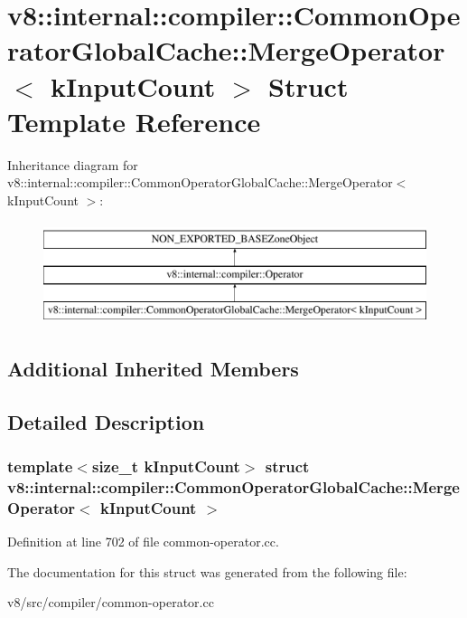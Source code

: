 \hypertarget{structv8_1_1internal_1_1compiler_1_1CommonOperatorGlobalCache_1_1MergeOperator}{}\section{v8\+:\+:internal\+:\+:compiler\+:\+:Common\+Operator\+Global\+Cache\+:\+:Merge\+Operator$<$ k\+Input\+Count $>$ Struct Template Reference}
\label{structv8_1_1internal_1_1compiler_1_1CommonOperatorGlobalCache_1_1MergeOperator}
Inheritance diagram for v8\+:\+:internal\+:\+:compiler\+:\+:Common\+Operator\+Global\+Cache\+:\+:Merge\+Operator$<$ k\+Input\+Count $>$\+:\begin{figure}[H]
\begin{center}
\leavevmode
\includegraphics[height=3.000000cm]{structv8_1_1internal_1_1compiler_1_1CommonOperatorGlobalCache_1_1MergeOperator}
\end{center}
\end{figure}
\subsection*{Additional Inherited Members}


\subsection{Detailed Description}
\subsubsection*{template$<$size\+\_\+t k\+Input\+Count$>$\newline
struct v8\+::internal\+::compiler\+::\+Common\+Operator\+Global\+Cache\+::\+Merge\+Operator$<$ k\+Input\+Count $>$}



Definition at line 702 of file common-\/operator.\+cc.



The documentation for this struct was generated from the following file\+:\begin{DoxyCompactItemize}
\item 
v8/src/compiler/common-\/operator.\+cc\end{DoxyCompactItemize}
